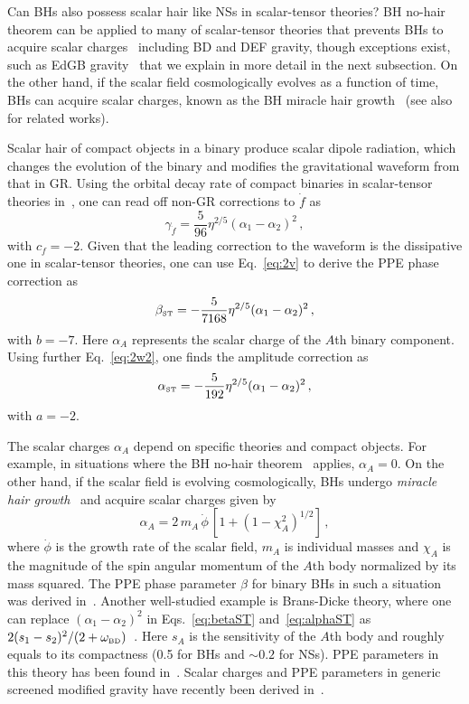 \documentclass[prd,twocolumn,nofootinbib]{revtex4-1}
\newcommand\be{\begin{equation}}
\newcommand\ee{\end{equation}}
\newcommand{\BD}{{\mbox{\tiny BD}}}
\newcommand{\ST}{{\mbox{\tiny ST}}}
\begin{document}
Can BHs also possess scalar hair like NSs in scalar-tensor theories? BH no-hair theorem can be applied to many of scalar-tensor theories that prevents BHs to acquire scalar charges~\cite{Hawking:1972qk,Bekenstein:1995un,Sotiriou:2011dz,Hui:2012qt,Maselli:2015yva} including BD and DEF gravity, though exceptions exist, such as EdGB gravity~\cite{Yunes:2011we,Sotiriou:2013qea,Sotiriou:2014pfa,Silva:2017uqg,Doneva:2017bvd} that we explain in more detail in the next subsection. On the other hand, if the scalar field cosmologically evolves as a function of time, BHs can acquire scalar charges, known as the BH miracle hair growth~\cite{Jacobson:1999vr,Horbatsch:2011ye} (see also~\cite{Healy:2011ef,Berti:2013gfa} for related works). 


Scalar hair of compact objects in a binary produce scalar dipole radiation, which changes the evolution of the binary and modifies the gravitational waveform from that in GR. Using the orbital decay rate of compact binaries in scalar-tensor theories in~\cite{Freire:2012mg,Wex:2014nva}, one can read off non-GR corrections to $\dot f$ as
\be
\gamma_{\dot f} = \frac{5}{96} \eta ^{2/5}(\alpha_1-\alpha_2)^2\,,
\ee
with $c_{\dot f} = -2$.
Given that the leading correction to the waveform is the dissipative one in scalar-tensor theories, one can use Eq.~\eqref{eq:2v} to derive the PPE phase correction as
\be\label{eq:betaST}
\beta_{\ST}=-\frac{5}{7168}\eta ^{2/5}(\alpha_1-\alpha_2)^2\,,
\ee
with $b=-7$. Here $\alpha_A$ represents the scalar charge of the $A$th binary component.
Using further Eq.~\eqref{eq:2w2}, one finds the amplitude correction as
\be\label{eq:alphaST}
\alpha_{\ST}=-\frac{5}{192}\eta ^{2/5}(\alpha_1-\alpha_2)^2\,,
\ee
with $a=-2$. 


The scalar charges $\alpha_A$ depend on specific theories and compact objects. For example, in situations where the BH no-hair theorem~\cite{Hawking:1972qk,Bekenstein:1995un,Sotiriou:2011dz} applies, $\alpha_A = 0$. On the other hand, if the scalar field is evolving cosmologically, BHs undergo \emph{miracle hair growth}~\cite{Jacobson:1999vr} and acquire scalar charges given by~\cite{Horbatsch:2011ye}
\be
\alpha_A = 2 \, m_A \, \dot \phi\, [1+(1-\chi_A^2)^{1/2}]\,,
\ee
where $\dot{\phi}$ is the growth rate of the scalar field, $m_A$ is individual masses and $\chi_A$ is the magnitude of the spin angular momentum of the $\mathit{A}\text{th}$ body normalized by its mass squared. The PPE phase parameter $\beta$ for binary BHs in such a situation was derived in~\cite{Yunes:2016jcc}. Another well-studied example is Brans-Dicke theory, where one can replace $(\alpha_1-\alpha_2)^2$ in Eqs.~\eqref{eq:betaST} and~\eqref{eq:alphaST} as $2 (s_1-s_2)^2/(2+\omega_\BD)$~\cite{Freire:2012mg}. Here $s_A$ is the sensitivity of the $A$th body and roughly equals to its compactness (0.5 for BHs and $\sim 0.2$ for NSs). PPE parameters in this theory has been found in~\cite{Chatziioannou:2012rf}. Scalar charges and PPE parameters in generic screened modified gravity have recently been derived in~\cite{Zhang:2017srh,Liu:2018sia}.
\end{document}
